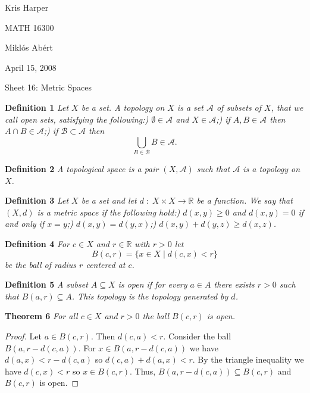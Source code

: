 \documentclass{article}
\begin{document}
\begin{flushright}
Kris Harper

MATH 16300

Mikl\'{o}s Ab\'{e}rt

April 15, 2008
\end{flushright}

\begin{flushleft}

\Large

Sheet 16: Metric Spaces\newline

\normalsize

\textbf{Definition 1}
\textsl{Let $X$ be a set. A topology on $X$ is a set $\mathcal{A}$ of subsets of $X$, that we call open sets, satisfying the following:) $\emptyset \in \mathcal{A}$ and $X \in \mathcal{A}$;) if $A, B \in \mathcal{A}$ then $A \cap B \in \mathcal{A}$;) if $\mathcal{B} \subset \mathcal{A}$ then
\[
\bigcup_{B \in \mathcal{B}} B \in \mathcal{A}.
\]}\newline

\textbf{Definition 2}
\textsl{A topological space is a pair $(X, \mathcal{A})$ such that $\mathcal{A}$ is a topology on $X$.}\newline

\textbf{Definition 3}
\textsl{Let $X$ be a set and let $d \; : \; X \times X \rightarrow \mathbb{R}$ be a function. We say that $(X, d)$ is a metric space if the following hold:) $d(x,y) \geq 0$ and $d(x,y) = 0$ if and only if $x=y$;) $d(x,y) = d(y,x)$;) $d(x,y) + d(y,z) \geq d(x,z)$.}\newline

\textbf{Definition 4}
\textsl{For $c \in X$ and $r \in \mathbb{R}$ with $r > 0$ let
\[
B(c,r) = \{x \in X \mid d(c,x) < r\}
\]
be the ball of radius $r$ centered at $c$.}\newline

\textbf{Definition 5}
\textsl{A subset $A \subseteq X$ is open if for every $a \in A$ there exists $r > 0$ such that $B(a,r) \subseteq A$. This topology is the topology generated by $d$.}\newline

\textbf{Theorem 6}
\textsl{For all $c \in X$ and $r > 0$ the ball $B(c,r)$ is open.}
\begin{proof}
Let $a \in B(c,r)$. Then $d(c,a) < r$. Consider the ball $B(a, r-d(c,a))$. For $x \in B(a, r-d(c,a))$ we have $d(a,x) < r - d(c,a)$ so $d(c,a) + d(a,x) < r$. By the triangle inequality we have $d(c,x) < r$ so $x \in B(c,r)$. Thus, $B(a, r-d(c,a)) \subseteq B(c,r)$ and $B(c,r)$ is open.
\end{proof}


\end{flushleft}
\end{document}
